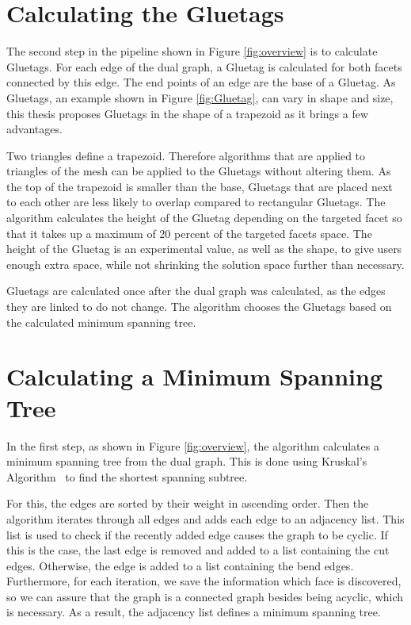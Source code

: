 \documentclass[draft,final]{vutinfth} %
\begin{document}
\section{Calculating the Gluetags}
\label{sec:calcgluetag}
The second step in the pipeline shown in Figure \ref{fig:overview} is to calculate Gluetags. For each edge of the dual graph, a Gluetag is calculated for both facets connected by this edge. The end points of an edge are the base of a Gluetag. As Gluetags, an example shown in Figure \ref{fig:Gluetag}, can vary in shape and size, this thesis proposes Gluetags in the shape of a trapezoid as it brings a few advantages. 

Two triangles define a trapezoid. Therefore algorithms that are applied to triangles of the mesh can be applied to the Gluetags without altering them. As the top of the trapezoid is smaller than the base, Gluetags that are placed next to each other are less likely to overlap compared to rectangular Gluetags. The algorithm calculates the height of the Gluetag depending on the targeted facet so that it takes up a maximum of 20 percent of the targeted facets space. The height of the Gluetag is an experimental value, as well as the shape, to give users enough extra space, while not shrinking the solution space further than necessary.

Gluetags are calculated once after the dual graph was calculated, as the edges they are linked to do not change. The algorithm chooses the Gluetags based on the calculated minimum spanning tree.

\section{Calculating a Minimum Spanning Tree}
\label{sec:calcmsp}
In the first step, as shown in Figure \ref{fig:overview}, the algorithm calculates a minimum spanning tree from the dual graph. This is done using Kruskal's Algorithm~\cite{kruskal1956shortest} to find the shortest spanning subtree.

For this, the edges are sorted by their weight in ascending order. Then the algorithm iterates through all edges and adds each edge to an adjacency list. This list is used to check if the recently added edge causes the graph to be cyclic. If this is the case, the last edge is removed and added to a list containing the cut edges. Otherwise, the edge is added to a list containing the bend edges. Furthermore, for each iteration, we save the information which face is discovered, so we can assure that the graph is a connected graph besides being acyclic, which is necessary. As a result, the adjacency list defines a minimum spanning tree.
\end{document}

